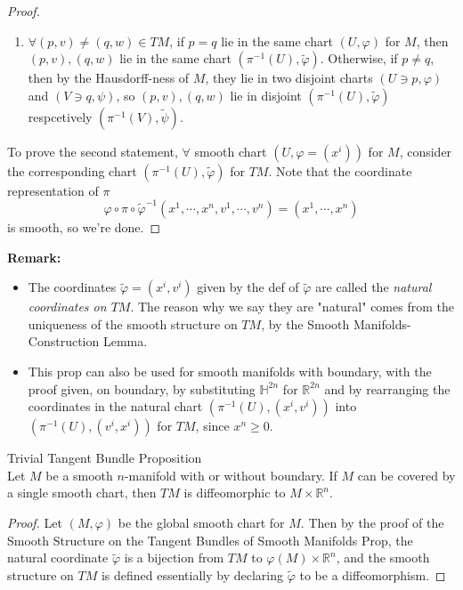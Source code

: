\begin{proof}
\begin{enumerate}
        \item $\forall (p,v) \neq (q,w) \in TM$, if $p=q$ lie in the same chart $(U,\varphi)$ for $M$, then $(p,v), (q,w)$ lie in the same chart $(\pi^{-1}(U),\widetilde{\varphi})$. Otherwise, if $p\neq q$, then by the Hausdorff-ness of $M$, they lie in two disjoint charts $(U\ni p, \varphi)$ and $(V\ni q, \psi)$, so $(p,v),(q,w)$ lie in disjoint $(\pi^{-1}(U),\widetilde{\varphi})$ respcetively $(\pi^{-1}(V),\widetilde{\psi})$.
    \end{enumerate}
    To prove the second statement, $\forall$ smooth chart $(U,\varphi=(x^i))$ for $M$, consider the corresponding chart $(\pi^{-1}(U),\widetilde{\varphi})$ for $TM$. Note that the coordinate representation of $\pi$
    \[
    \varphi\circ \pi \circ \widetilde{\varphi}^{-1} (x^1 ,\cdots, x^n,v^1 ,\cdots, v^n)= (x^1 ,\cdots, x^n)
    \]
    is smooth, so we're done.
\end{proof}


\noindent\textbf{Remark:} \begin{itemize}
    \item The coordinates $\widetilde{\varphi} =(x^i,v^i)$ given by the def of $\widetilde{\varphi}$ are called the \textit{natural coordinates on $TM$}. The reason why we say they are "natural" comes from the uniqueness of the smooth structure on $TM$, by the Smooth Manifolds-Construction Lemma.

    \item This prop can also be used for smooth manifolds with boundary, with the proof given, on boundary, by substituting $\mathbb{H}^{2n}$ for $\mathbb{R}^{2n}$ and by rearranging the coordinates in the natural chart $(\pi^{-1} (U), (x^i,v^i))$ into $(\pi^{-1}(U), (v^i,x^i))$ for $TM$, since $x^n\geq 0$.
\end{itemize}

\begin{proposition}{Trivial Tangent Bundle Proposition}\\
Let $M$ be a smooth $n$-manifold with or without boundary. If $M$ can be covered by a single smooth chart, then $TM$ is diffeomorphic to $M\times \mathbb{R}^n$.
\end{proposition}

\begin{proof}
    Let $(M,\varphi)$ be the global smooth chart for $M$. Then by the proof of the Smooth Structure on the Tangent Bundles of Smooth Manifolds Prop, the natural coordinate $\widetilde{\varphi}$ is a bijection from $TM$ to $\varphi(M) \times \mathbb{R}^n$, and the smooth structure on $TM$ is defined essentially by declaring $\widetilde{\varphi}$ to be a diffeomorphism.
\end{proof}

